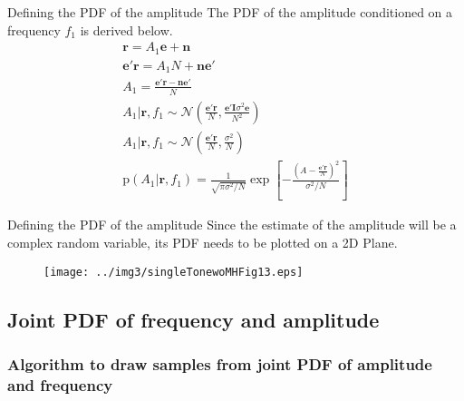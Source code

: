 ﻿\documentclass[mathserif]{beamer}
\begin{document}
	\begin{frame}{Defining the PDF of the amplitude}
		The PDF of the amplitude conditioned on a frequency $f_1$ is derived below.
		\begin{gather*}
			\mathbf{r} =  A_1\mathbf{e}+\mathbf{n}\\
			\mathbf{e'r} =  A_1N+\mathbf{ne}' \\
			A_1 = \frac{\mathbf{e'r}-\mathbf{n}\mathbf{e}'}{N} \\			
			A_1|\mathbf{r},f_1  \sim \mathcal{N}\left(\frac{\mathbf{e'r}}{N},\frac{\mathbf{e'I}\sigma^2\mathbf{e}}{N^2}\right) \\			
			A_1|\mathbf{r},f_1 \sim \mathcal{N}\left(\frac{\mathbf{e'r}}{N},\frac{\sigma^2}{N}\right) \\
			\mathrm{p}(A_1|\mathbf{r},f_1) = \frac{1}{\sqrt{\pi\sigma^2/N}}\exp\left[-\frac{(A - \frac{\mathbf{e'r}}{N})^2}{\sigma^2/N}\right]
		\end{gather*}		
	\end{frame}
	
	\begin{frame}{Defining the PDF of the amplitude}
	Since the estimate of the amplitude will be a complex random variable, its PDF needs to be plotted on a 2D Plane.
		\begin{figure}
			\centering
			\texttt{[image: ../img3/singleTonewoMHFig13.eps]}
		\end{figure}
	\end{frame}
	
	\subsection{Joint PDF of frequency and amplitude}
	\begin{frame}[fragile]
		\frametitle{Algorithm to draw samples from joint PDF of amplitude and frequency}
		\begin{algorithm}[H]
		\end{algorithm}

\end{frame}
	
\end{document}

